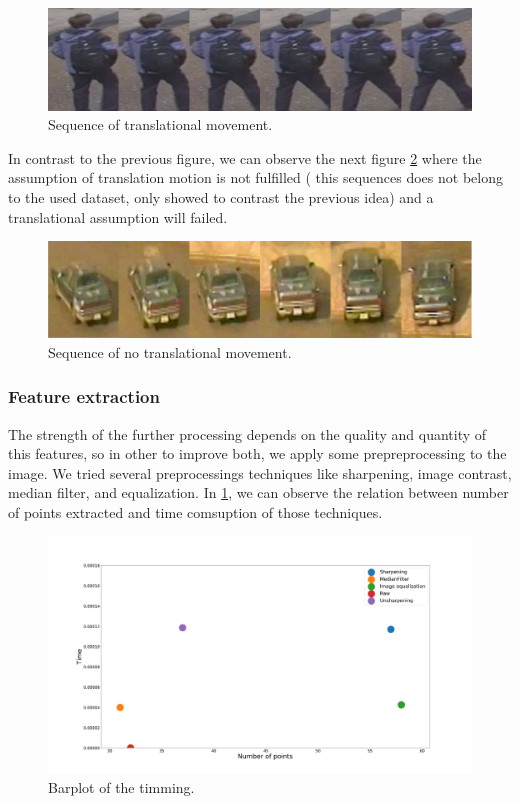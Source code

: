 \begin{figure}[H]
\centering         
\includegraphics[width=0.9\linewidth]{changeCamera/tomeu.png}
\caption{Sequence of translational movement.} \label{track1w}
\end{figure}

In contrast to the previous figure, we can observe the next figure \ref{track2w} where the assumption of translation motion is not fulfilled ( this sequences does not belong to the used dataset, only showed to contrast the previous idea) and a translational assumption will failed.

\begin{figure}[H]
\centering         
\includegraphics[width=0.9\linewidth]{changeCamera/out2.png}
\caption{Sequence of no translational movement.} \label{track2w}
\end{figure}





\subsubsection{Feature extraction}

The strength of the further processing depends on the quality and quantity of this features, so in other to improve both, we apply some prepreprocessing to the image. We tried several preprocessings techniques like sharpening, image contrast, median filter, and equalization. In \ref{track1w}, we can observe the relation between number of points extracted and time comsuption of those techniques.




\begin{figure}[H]
\centering         
\includegraphics[width=0.9\linewidth]{tracker/preprocesing.png}
\caption{Barplot of the timming.} \label{timing1}
\end{figure}

